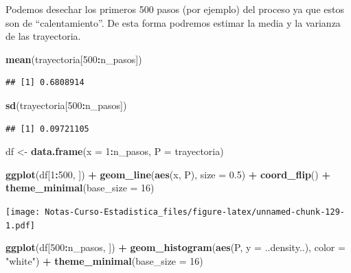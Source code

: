 \documentclass[
  12pt,
]{book}
\newenvironment{Shaded}{\begin{snugshade}}{\end{snugshade}}
\newcommand{\DataTypeTok}[1]{\textcolor[rgb]{0.13,0.29,0.53}{#1}}
\newcommand{\DecValTok}[1]{\textcolor[rgb]{0.00,0.00,0.81}{#1}}
\newcommand{\FloatTok}[1]{\textcolor[rgb]{0.00,0.00,0.81}{#1}}
\newcommand{\KeywordTok}[1]{\textcolor[rgb]{0.13,0.29,0.53}{\textbf{#1}}}
\newcommand{\NormalTok}[1]{#1}
\newcommand{\OperatorTok}[1]{\textcolor[rgb]{0.81,0.36,0.00}{\textbf{#1}}}
\newcommand{\StringTok}[1]{\textcolor[rgb]{0.31,0.60,0.02}{#1}}
\theoremstyle{definition}
\theoremstyle{definition}
\theoremstyle{definition}
\theoremstyle{remark}
\begin{document}
Podemos desechar los primeros 500 pasos (por ejemplo) del proceso ya que estos son de \enquote{calentamiento}. De esta forma podremos estimar la media y la varianza de las trayectoria.

\begin{Shaded}
\begin{Highlighting}[]
\KeywordTok{mean}\NormalTok{(trayectoria[}\DecValTok{500}\OperatorTok{:}\NormalTok{n_pasos])}
\end{Highlighting}
\end{Shaded}

\begin{verbatim}
## [1] 0.6808914
\end{verbatim}

\begin{Shaded}
\begin{Highlighting}[]
\KeywordTok{sd}\NormalTok{(trayectoria[}\DecValTok{500}\OperatorTok{:}\NormalTok{n_pasos])}
\end{Highlighting}
\end{Shaded}

\begin{verbatim}
## [1] 0.09721105
\end{verbatim}

\begin{Shaded}
\begin{Highlighting}[]
\NormalTok{df <-}\StringTok{ }\KeywordTok{data.frame}\NormalTok{(}\DataTypeTok{x =} \DecValTok{1}\OperatorTok{:}\NormalTok{n_pasos, }\DataTypeTok{P =}\NormalTok{ trayectoria)}

\KeywordTok{ggplot}\NormalTok{(df[}\DecValTok{1}\OperatorTok{:}\DecValTok{500}\NormalTok{, ]) }\OperatorTok{+}\StringTok{ }\KeywordTok{geom_line}\NormalTok{(}\KeywordTok{aes}\NormalTok{(x, P), }\DataTypeTok{size =} \FloatTok{0.5}\NormalTok{) }\OperatorTok{+}\StringTok{ }
\StringTok{    }\KeywordTok{coord_flip}\NormalTok{() }\OperatorTok{+}\StringTok{ }\KeywordTok{theme_minimal}\NormalTok{(}\DataTypeTok{base_size =} \DecValTok{16}\NormalTok{)}
\end{Highlighting}
\end{Shaded}

\texttt{[image: Notas-Curso-Estadistica\_files/figure-latex/unnamed-chunk-129-1.pdf]}

\begin{Shaded}
\begin{Highlighting}[]
\KeywordTok{ggplot}\NormalTok{(df[}\DecValTok{500}\OperatorTok{:}\NormalTok{n_pasos, ]) }\OperatorTok{+}\StringTok{ }\KeywordTok{geom_histogram}\NormalTok{(}\KeywordTok{aes}\NormalTok{(P, }\DataTypeTok{y =}\NormalTok{ ..density..), }
    \DataTypeTok{color =} \StringTok{"white"}\NormalTok{) }\OperatorTok{+}\StringTok{ }\KeywordTok{theme_minimal}\NormalTok{(}\DataTypeTok{base_size =} \DecValTok{16}\NormalTok{)}
\end{Highlighting}
\end{Shaded}
\end{document}

